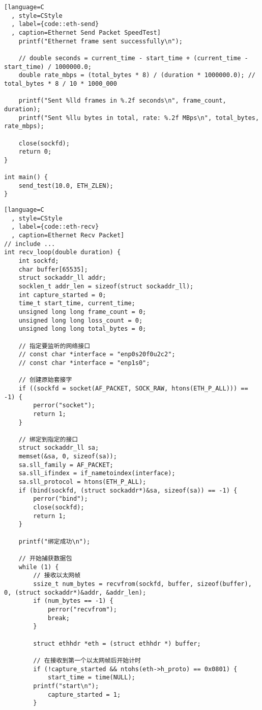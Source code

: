 \begin{lstlisting}[language=C
  , style=CStyle
  , label={code::eth-send}
  , caption=Ethernet Send Packet SpeedTest]
    printf("Ethernet frame sent successfully\n");

    // double seconds = current_time - start_time + (current_time - start_time) / 1000000.0;
    double rate_mbps = (total_bytes * 8) / (duration * 1000000.0); // total_bytes * 8 / 10 * 1000_000

    printf("Sent %lld frames in %.2f seconds\n", frame_count, duration);
    printf("Sent %llu bytes in total, rate: %.2f MBps\n", total_bytes, rate_mbps);

    close(sockfd);
    return 0;
}

int main() {
    send_test(10.0, ETH_ZLEN);
}
\end{lstlisting}

\begin{lstlisting}[language=C
  , style=CStyle
  , label={code::eth-recv}
  , caption=Ethernet Recv Packet]
// include ...
int recv_loop(double duration) {
    int sockfd;
    char buffer[65535];
    struct sockaddr_ll addr;
    socklen_t addr_len = sizeof(struct sockaddr_ll);
    int capture_started = 0;
    time_t start_time, current_time;
    unsigned long long frame_count = 0;
    unsigned long long loss_count = 0;
    unsigned long long total_bytes = 0;

    // 指定要监听的网络接口
    // const char *interface = "enp0s20f0u2c2";
    // const char *interface = "enp1s0";

    // 创建原始套接字
    if ((sockfd = socket(AF_PACKET, SOCK_RAW, htons(ETH_P_ALL))) == -1) {
        perror("socket");
        return 1;
    }

    // 绑定到指定的接口
    struct sockaddr_ll sa;
    memset(&sa, 0, sizeof(sa));
    sa.sll_family = AF_PACKET;
    sa.sll_ifindex = if_nametoindex(interface);
    sa.sll_protocol = htons(ETH_P_ALL);
    if (bind(sockfd, (struct sockaddr*)&sa, sizeof(sa)) == -1) {
        perror("bind");
        close(sockfd);
        return 1;
    }

    printf("绑定成功\n");

    // 开始捕获数据包
    while (1) {
        // 接收以太网帧
        ssize_t num_bytes = recvfrom(sockfd, buffer, sizeof(buffer), 0, (struct sockaddr*)&addr, &addr_len);
        if (num_bytes == -1) {
            perror("recvfrom");
            break;
        }

        struct ethhdr *eth = (struct ethhdr *) buffer;

        // 在接收到第一个以太网帧后开始计时
        if (!capture_started && ntohs(eth->h_proto) == 0x0801) {
            start_time = time(NULL);
	    printf("start\n");
            capture_started = 1;
        }


\end{lstlisting}

